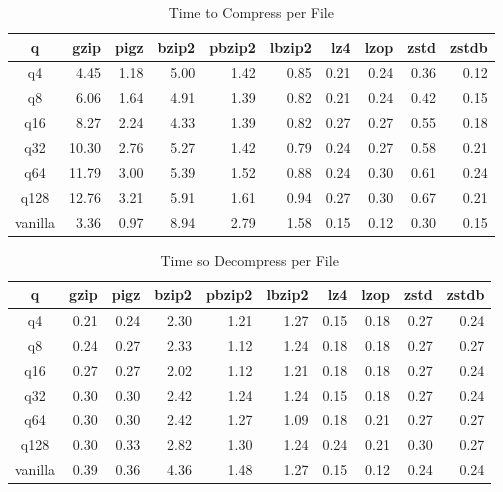 \begin{table}
\caption{Time to Compress per File}
\centering
\begin{tabular}[]{crrrrrrrrr}
\hline
 q        &  gzip & pigz & bzip2 & pbzip2 & lbzip2 & lz4 & lzop & zstd & zstdb  \\
\hline
 q4       &    4.45 &   1.18 &   5.00 &   1.42 &   0.85 &   0.21 &   0.24 &   0.36 &   0.12  \\
 q8       &    6.06 &   1.64 &   4.91 &   1.39 &   0.82 &   0.21 &   0.24 &   0.42 &   0.15  \\
 q16      &    8.27 &   2.24 &   4.33 &   1.39 &   0.82 &   0.27 &   0.27 &   0.55 &   0.18  \\
 q32      &   10.30 &   2.76 &   5.27 &   1.42 &   0.79 &   0.24 &   0.27 &   0.58 &   0.21  \\
 q64      &   11.79 &   3.00 &   5.39 &   1.52 &   0.88 &   0.24 &   0.30 &   0.61 &   0.24  \\
 q128     &   12.76 &   3.21 &   5.91 &   1.61 &   0.94 &   0.27 &   0.30 &   0.67 &   0.21  \\
 vanilla  &    3.36 &   0.97 &   8.94 &   2.79 &   1.58 &   0.15 &   0.12 &   0.30 &   0.15  \\
\hline
\end{tabular}
\label{timing_compress}
\end{table}

\begin{table}
\caption{Time so Decompress per File}
\centering
\begin{tabular}[]{crrrrrrrrr}
\hline
 q        &  gzip & pigz & bzip2 & pbzip2 & lbzip2 & lz4 & lzop & zstd & zstdb  \\
\hline
 q4       &    0.21 &   0.24 &   2.30 &   1.21 &   1.27 &   0.15 &   0.18 &   0.27 &   0.24  \\
 q8       &    0.24 &   0.27 &   2.33 &   1.12 &   1.24 &   0.18 &   0.18 &   0.27 &   0.27  \\
 q16      &    0.27 &   0.27 &   2.02 &   1.12 &   1.21 &   0.18 &   0.18 &   0.27 &   0.24  \\
 q32      &    0.30 &   0.30 &   2.42 &   1.24 &   1.24 &   0.15 &   0.18 &   0.27 &   0.24  \\
 q64      &    0.30 &   0.30 &   2.42 &   1.27 &   1.09 &   0.18 &   0.21 &   0.27 &   0.27  \\
 q128     &    0.30 &   0.33 &   2.82 &   1.30 &   1.24 &   0.24 &   0.21 &   0.30 &   0.27  \\
 vanilla  &    0.39 &   0.36 &   4.36 &   1.48 &   1.27 &   0.15 &   0.12 &   0.24 &   0.24  \\
\hline
\end{tabular}
\label{timing_decompress}
\end{table}


